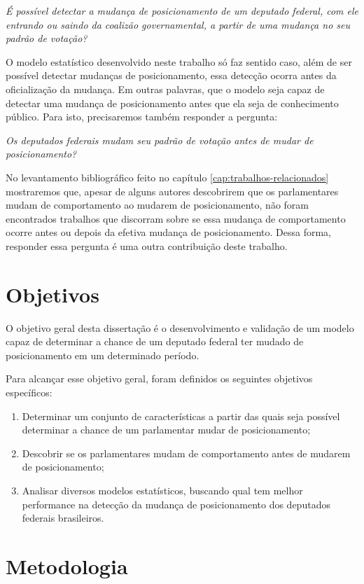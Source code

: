 \emph{É possível detectar a mudança de posicionamento de um deputado federal,
com ele entrando ou saindo da coalizão governamental, a partir de uma mudança
no seu padrão de votação?}

O modelo estatístico desenvolvido neste trabalho só faz sentido caso, além de
ser possível detectar mudanças de posicionamento, essa detecção ocorra antes da
oficialização da mudança. Em outras palavras, que o modelo seja capaz de
detectar uma mudança de posicionamento antes que ela seja de conhecimento
público. Para isto, precisaremos também responder a pergunta:

\emph{Os deputados federais mudam seu padrão de votação antes de mudar de
posicionamento?}

No levantamento bibliográfico feito no capítulo
\ref{cap:trabalhos-relacionados} mostraremos que, apesar de alguns autores
descobrirem que os parlamentares mudam de comportamento ao mudarem de
posicionamento, não foram encontrados trabalhos que discorram sobre se essa
mudança de comportamento ocorre antes ou depois da efetiva mudança de
posicionamento. Dessa forma, responder essa pergunta é uma outra contribuição
deste trabalho.

\section{Objetivos}

O objetivo geral desta dissertação é o desenvolvimento e validação de um modelo
capaz de determinar a chance de um deputado federal ter mudado de
posicionamento em um determinado período.

Para alcançar esse objetivo geral, foram definidos os seguintes objetivos
específicos:

\begin{enumerate}
  \item Determinar um conjunto de características a partir das quais seja
    possível determinar a chance de um parlamentar mudar de posicionamento;
  \item Descobrir se os parlamentares mudam de comportamento antes de mudarem
    de posicionamento;
  \item Analisar diversos modelos estatísticos, buscando qual tem melhor
    performance na detecção da mudança de posicionamento dos deputados
    federais brasileiros.
\end{enumerate}

\section{Metodologia}

